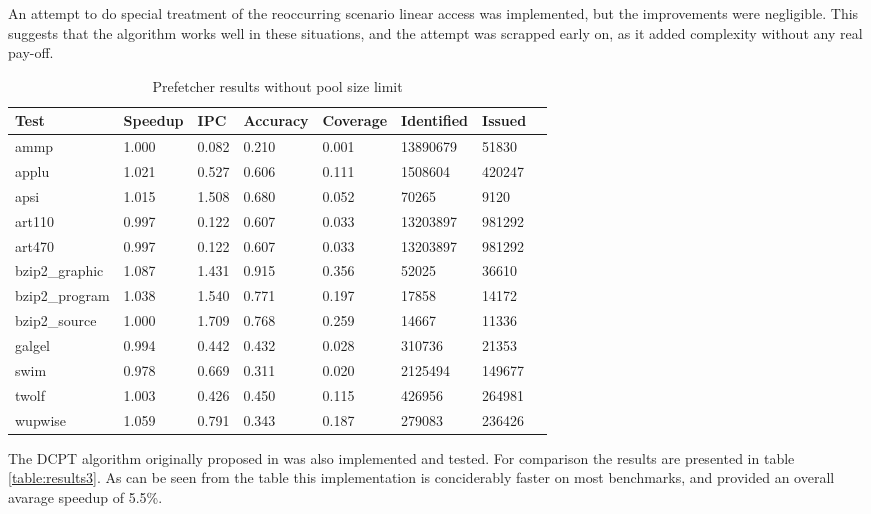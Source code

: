 An attempt to do special treatment of the reoccurring scenario linear access was implemented, but the improvements were negligible. This suggests that the algorithm works well in these situations, and the attempt was scrapped early on, as it added complexity without any real pay-off.


\begin{table*}[!t]
\renewcommand{\arraystretch}{1.3}
\caption{Prefetcher results without pool size limit}
\label{table:results2}
\centering
\begin{tabular}{|l|l|l|l|l|l|l|l|}
\hline
\bfseries Test & \bfseries Speedup & \bfseries IPC & \bfseries Accuracy & \bfseries Coverage & \bfseries Identified & \bfseries Issued\\
\hline
\hline
ammp 		& 1.000  &	0.082 &	0.210 &	0.001 &	13890679 &	51830\\
applu 		& 1.021 & 	0.527 &	0.606 &	0.111 &	1508604 & 	420247\\
apsi 		& 1.015 & 	1.508 &	0.680 &	0.052 &	70265 &	9120\\	
art110 		& 0.997 & 	0.122 &	0.607 &	0.033 &	13203897 &	981292\\	
art470 		& 0.997 & 	0.122 &	0.607 &	0.033 &	13203897 &	981292\\
bzip2\_graphic 	& 1.087 & 	1.431 &	0.915 &	0.356 &	52025 &	36610\\
bzip2\_program 	& 1.038 & 	1.540 &	0.771 &	0.197 &	17858 &	14172 	\\
bzip2\_source 	& 1.000 & 	1.709 &	0.768 &	0.259 &	14667 &	11336\\
galgel 		& 0.994 & 	0.442 &	0.432 &	0.028 &	310736 & 21353\\
swim 		& 0.978 & 	0.669 &	0.311 &	0.020 &	2125494 & 	149677\\
twolf 		& 1.003 & 	0.426 &	0.450 &	0.115 &	426956 & 	264981	\\
wupwise 	& 1.059 & 	0.791 &	0.343 &	0.187 &	279083 & 	236426\\
\hline
\end{tabular}
\end{table*}



The DCPT algorithm originally proposed in \cite{reference:jahre} was also implemented and tested. For comparison the results are presented in table \ref{table:results3}. As can be seen from the table this implementation is conciderably faster on most benchmarks, and provided an overall avarage speedup of 5.5\%.


